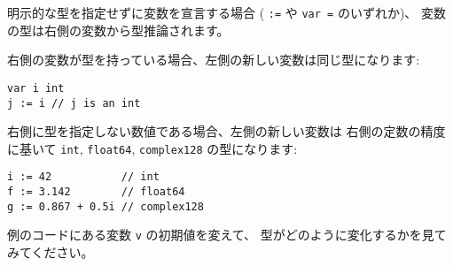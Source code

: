 明示的な型を指定せずに変数を宣言する場合
( \texttt{:=} や \texttt{var =} のいずれか)、
変数の型は右側の変数から型推論されます。

右側の変数が型を持っている場合、左側の新しい変数は同じ型になります:

\begin{lstlisting}[numbers=none]
var i int
j := i // j is an int
\end{lstlisting}

右側に型を指定しない数値である場合、左側の新しい変数は
右側の定数の精度に基いて \texttt{int}, \texttt{float64},
\texttt{complex128} の型になります:

\begin{lstlisting}[numbers=none]
i := 42           // int
f := 3.142        // float64
g := 0.867 + 0.5i // complex128
\end{lstlisting}

例のコードにある変数 \texttt{v} の初期値を変えて、
型がどのように変化するかを見てみてください。
